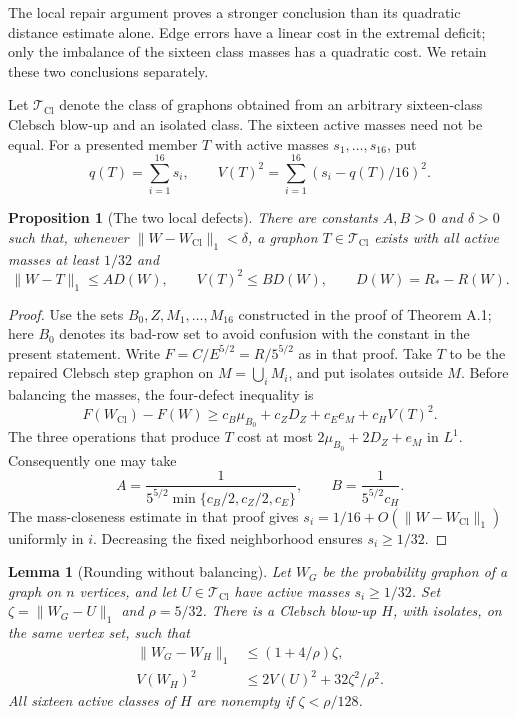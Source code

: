 \documentclass[11pt]{amsart}
\newtheorem{lemma}[theorem]{Lemma}
\newtheorem{proposition}[theorem]{Proposition}
\theoremstyle{definition}
\theoremstyle{remark}
\begin{document}
The local repair argument proves a stronger conclusion than its quadratic
distance estimate alone. Edge errors have a linear cost in the extremal
deficit; only the imbalance of the sixteen class masses has a quadratic
cost. We retain these two conclusions separately.

Let $\mathcal T_{\mathrm{Cl}}$ denote the class of graphons obtained from an
arbitrary sixteen-class Clebsch blow-up and an isolated class. The sixteen
active masses need not be equal. For a presented member $T$ with active
masses $s_1,\ldots,s_{16}$, put
\[
 q(T)=\sum_{i=1}^{16}s_i,\qquad
 V(T)^2=\sum_{i=1}^{16}(s_i-q(T)/16)^2.
\]

\begin{proposition}[The two local defects]\label{prop:two-defects}
There are constants $A,B>0$ and $\delta>0$ such that, whenever
$\|W-W_{\mathrm{Cl}}\|_1<\delta$, a graphon $T\in\mathcal T_{\mathrm{Cl}}$
exists with all active masses at least $1/32$ and
\begin{equation}\tag{44}\label{eq:44}
 \|W-T\|_1\leq AD(W),\qquad V(T)^2\leq BD(W),\qquad
 D(W)=R_\ast-R(W).
\end{equation}
\end{proposition}

\begin{proof}
Use the sets $B_0,Z,M_1,\ldots,M_{16}$ constructed in the proof of Theorem
A.1; here $B_0$ denotes its bad-row set to avoid confusion with the constant
in the present statement. Write $F=C/E^{5/2}=R/5^{5/2}$ as in that proof.
Take $T$ to be the repaired Clebsch step graphon on $M=\bigcup_i M_i$, and
put isolates outside $M$. Before balancing the masses, the four-defect
inequality is
\[
 F(W_{\mathrm{Cl}})-F(W)
 \geq c_B\mu_{B_0}+c_ZD_Z+c_Ee_M+c_HV(T)^2.
\]
The three operations that produce $T$ cost at most
$2\mu_{B_0}+2D_Z+e_M$ in $L^1$. Consequently one may take
\[
 A=\frac1{5^{5/2}\min\{c_B/2,c_Z/2,c_E\}},\qquad
 B=\frac1{5^{5/2}c_H}.
\]
The mass-closeness estimate in that proof gives
$s_i=1/16+O(\|W-W_{\mathrm{Cl}}\|_1)$ uniformly in $i$. Decreasing the
fixed neighborhood ensures $s_i\geq1/32$.
\end{proof}

\begin{lemma}[Rounding without balancing]\label{lem:unbalanced-rounding}
Let $W_G$ be the probability graphon of a graph on $n$ vertices, and let
$U\in\mathcal T_{\mathrm{Cl}}$ have active masses $s_i\geq1/32$. Set
$\zeta=\|W_G-U\|_1$ and $\rho=5/32$. There is a Clebsch blow-up $H$, with
isolates, on the same vertex set, such that
\begin{align}
 \|W_G-W_H\|_1&\leq(1+4/\rho)\zeta,\tag{45}\label{eq:45}\\
 V(W_H)^2&\leq2V(U)^2+32\zeta^2/\rho^2.\tag{46}\label{eq:46}
\end{align}
All sixteen active classes of $H$ are nonempty if $\zeta<\rho/128$.
\end{lemma}
\end{document}
